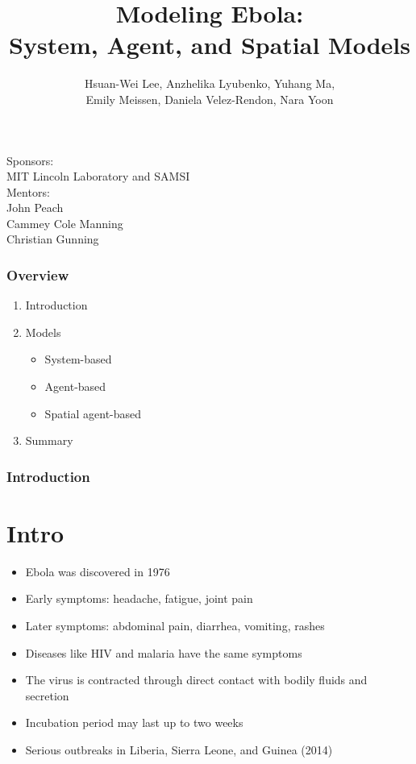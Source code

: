 \documentclass[30pt]{beamer}
\author{ Hsuan-Wei Lee,
  Anzhelika Lyubenko,
  Yuhang Ma,\\
  Emily Meissen,
  Daniela Velez-Rendon,
    Nara Yoon}
\title[]{Modeling Ebola:\\ System, Agent, and Spatial Models}
\begin{document}
\begin{frame}[t,plain]
    \titlepage
        \begin{center}
        Sponsors:\\MIT Lincoln Laboratory and SAMSI\\\vspace{3mm}
Mentors:\\John Peach\\ Cammey Cole Manning\\
Christian Gunning
\end{center}
\end{frame}

\begin{frame}[t,plain]
    \frametitle{Overview}
\begin{enumerate}
\vfill
\item Introduction\vspace{2mm}
\item Models
\begin{itemize}
\item System-based
\item Agent-based
\item Spatial agent-based
\end{itemize}
\item Summary
\end{enumerate}
\end{frame}

\begin{frame}
\frametitle{Introduction}
\section{Intro}
\begin{itemize}
\item Ebola was discovered in 1976
\item Early symptoms:  headache, fatigue, joint pain
\item Later symptoms: abdominal pain, diarrhea, vomiting, rashes
\item Diseases like HIV and malaria have the same symptoms
\item The virus is contracted through direct contact with bodily fluids and secretion
\item Incubation period may last up to two weeks
\item Serious outbreaks in Liberia, Sierra Leone, and Guinea (2014)
\end{itemize}
\end{frame}
\end{document}

